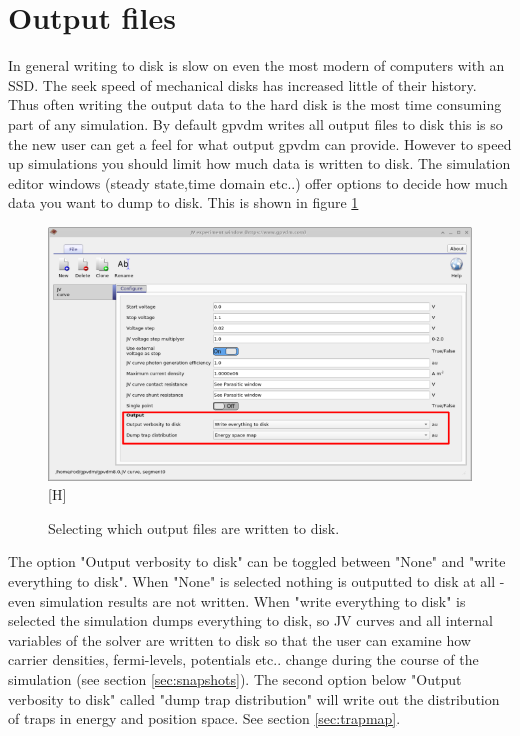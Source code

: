 \newpage
\section{Output files}
In general writing to disk is slow on even the most modern of computers with an SSD.  The seek speed of mechanical disks has increased little of their history.  Thus often writing the output data to the hard disk is the most time consuming part of any simulation.  By default gpvdm writes all output files to disk this is so the new user can get a feel for what output gpvdm can provide.  However to speed up simulations you should limit how much data is written to disk. The simulation editor windows (steady state,time domain etc..) offer options to decide how much data you want to dump to disk. This is shown in figure \ref{fig:jveditorwindow} 

\begin{figure}[H]
\centering
\includegraphics[width=\textwidth]{./images/jv_editor_window.png}[H]
\caption{Selecting which output files are written to disk.}
\label{fig:jveditorwindow}
\end{figure}

The option "Output verbosity to disk" can be toggled between "None" and "write everything to disk".  When "None" is selected nothing is outputted to disk at all - even simulation results are not written.  When "write everything to disk" is selected the simulation dumps everything to disk, so JV curves and all internal variables of the solver are written to disk so that the user can examine how carrier densities, fermi-levels, potentials etc.. change during the course of the simulation (see section \ref{sec:snapshots}). The second option below "Output verbosity to disk" called "dump trap distribution" will write out the distribution of traps in energy and position space.  See section \ref{sec:trapmap}.


